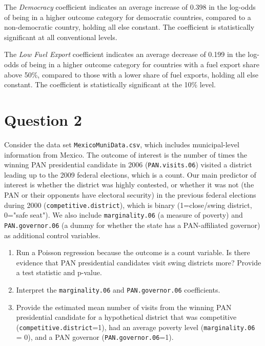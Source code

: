 \documentclass[12pt,letterpaper]{article}
\begin{document}
\noindent The \emph{Democracy} coefficient indicates an average increase of 0.398 in the log-odds of being in a higher outcome category for democratic countries, compared to a non-democratic country, holding all else constant. The coefficient is statistically significant at all conventional levels.

\noindent The \emph{Low Fuel Export} coefficient indicates an average decrease of 0.199 in the log-odds of being in a higher outcome category for countries with a fuel export share above 50\%, compared to those with a lower share of fuel exports, holding all else constant. The coefficient is statistically significant at the 10\% level.

\newpage
\section*{Question 2} 
\vspace{.25cm}

\noindent Consider the data set \texttt{MexicoMuniData.csv}, which includes municipal-level information from Mexico. The outcome of interest is the number of times the winning PAN presidential candidate in 2006 (\texttt{PAN.visits.06}) visited a district leading up to the 2009 federal elections, which is a count. Our main predictor of interest is whether the district was highly contested, or whether it was not (the PAN or their opponents have electoral security) in the previous federal elections during 2000 (\texttt{competitive.district}), which is binary (1=close/swing district, 0="safe seat"). We also include \texttt{marginality.06} (a measure of poverty) and \texttt{PAN.governor.06} (a dummy for whether the state has a PAN-affiliated governor) as additional control variables. 

\begin{enumerate}
	\item [(a)]
	Run a Poisson regression because the outcome is a count variable. Is there evidence that PAN presidential candidates visit swing districts more? Provide a test statistic and p-value.

	\item [(b)]
	Interpret the \texttt{marginality.06} and \texttt{PAN.governor.06} coefficients.
	
	\item [(c)]
	Provide the estimated mean number of visits from the winning PAN presidential candidate for a hypothetical district that was competitive (\texttt{competitive.district}=1), had an average poverty level (\texttt{marginality.06} = 0), and a PAN governor (\texttt{PAN.governor.06}=1).
	
\end{enumerate}
\end{document}
